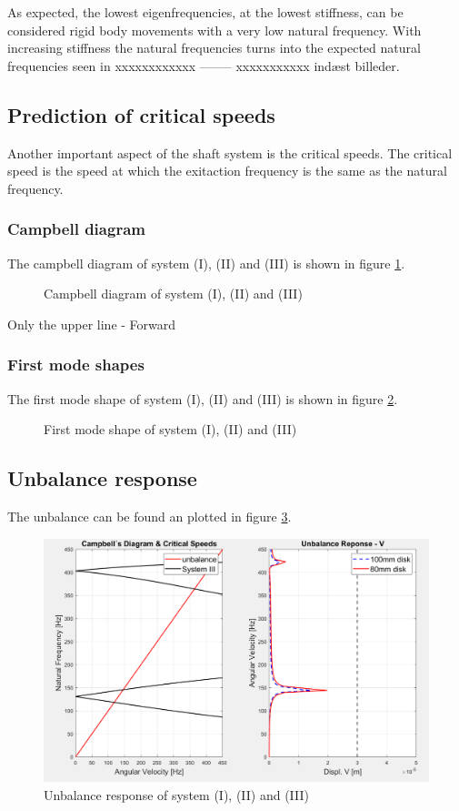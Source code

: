 As expected, the lowest eigenfrequencies, at the lowest stiffness, can be considered rigid body movements with a very low natural frequency.
With increasing stiffness the natural frequencies turns into the expected natural frequencies seen in xxxxxxxxxxxx -------- xxxxxxxxxxx indæst billeder.

\subsection{Prediction of critical speeds}
Another important aspect of the shaft system is the critical speeds. The critical speed is the speed at which the exitaction frequency is the same as the natural frequency.

\subsubsection{Campbell diagram}
The campbell diagram of system (I), (II) and (III) is shown in figure \ref{fig:campbell_diagram}.
\begin{figure}[htbp]
    \centering
    
    \caption{Campbell diagram of system (I), (II) and (III)}
    \label{fig:campbell_diagram}
\end{figure}

Only the upper line - Forward


\subsubsection{First mode shapes}
The first mode shape of system (I), (II) and (III) is shown in figure \ref{fig:first_mode_shape}.
\begin{figure}[htbp]
    \centering
    
    \caption{First mode shape of system (I), (II) and (III)}
    \label{fig:first_mode_shape}
\end{figure}


\subsection{Unbalance response \label{sec:unbalance_response_ball_bearing}}
The unbalance can be found an plotted in figure \ref{fig:unbalance_response}.
\begin{figure}[htbp]
    \centering
    \includegraphics[width=0.8\linewidth]{04/2/image.png}
    \caption{Unbalance response of system (I), (II) and (III)}
    \label{fig:unbalance_response}
\end{figure}

